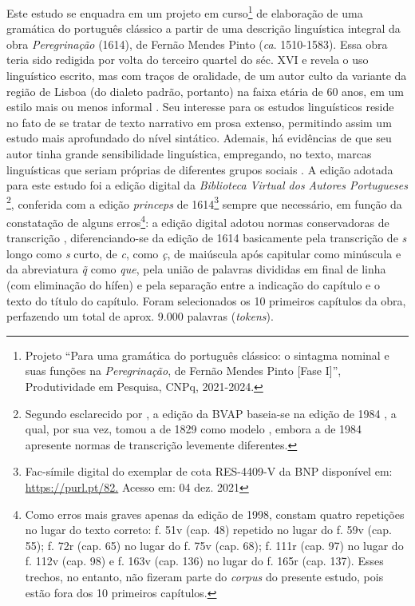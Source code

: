 \documentclass[portuguese]{textolivre}
\begin{document}
Este estudo se enquadra em um projeto em curso\footnote{Projeto “Para uma gramática do português clássico: o sintagma nominal e suas funções na \textit{Peregrinação}, de Fernão Mendes Pinto [Fase I]”, Produtividade em Pesquisa, CNPq, 2021-2024.} de elaboração de uma gramática do português clássico a partir de uma descrição linguística integral da obra \textit{Peregrinação} (1614), de Fernão Mendes Pinto (\textit{ca}. 1510-1583). Essa obra teria sido redigida por volta do terceiro quartel do séc. XVI e revela o uso linguístico escrito, mas com traços de oralidade, de um autor culto da variante da região de Lisboa (do dialeto padrão, portanto) na faixa etária de 60 anos, em um estilo mais ou menos informal \cite{cambraia_contributo_2000}. Seu interesse para os estudos linguísticos reside no fato de se tratar de texto narrativo em prosa extenso, permitindo assim um estudo mais aprofundado do nível sintático. Ademais, há evidências de que seu autor tinha grande sensibilidade linguística, empregando, no texto, marcas linguísticas que seriam próprias de diferentes grupos sociais \cite{cambraia_mudancinterrompida_2003}. A edição adotada para este estudo foi a edição digital da \textit{Biblioteca Virtual dos Autores Portugueses} \cite{biblioteca_coordenacao_1998}\footnote{Segundo esclarecido por \textcite[p.~185]{correia_construcao_1999}, a edição da BVAP baseia-se na edição de 1984 \cite{pinto_peregrinacao_1984}, a qual, por sua vez, tomou a de 1829 \cite{pinto_peregrinacao_1829} como modelo \cite[p.~VI]{pinto_peregrinacao_1984}, embora a de 1984 apresente normas de transcrição levemente diferentes.}, conferida com a edição \textit{princeps} de 1614\footnote{Fac-símile digital do exemplar de cota RES-4409-V da BNP disponível em: \url{https://purl.pt/82.} Acesso em: 04 dez. 2021} sempre que necessário, em função da constatação de alguns erros\footnote{Como erros mais graves apenas da edição de 1998, constam quatro repetições no lugar do texto correto: f. 51v (cap. 48) repetido no lugar do f. 59v (cap. 55); f. 72r (cap. 65) no lugar do f. 75v (cap. 68); f. 111r (cap. 97) no lugar do f. 112v (cap. 98) e  f. 163v (cap. 136) no lugar do f. 165r (cap. 137). Esses trechos, no entanto, não fizeram parte do \textit{corpus} do presente estudo, pois estão fora dos 10 primeiros capítulos.}: a edição digital adotou normas conservadoras de transcrição \cite{cambraia_introducao_2005}, diferenciando-se da edição de 1614 basicamente pela transcrição de \textit{s} longo como \textit{s} curto, de \textit{c}, como \textit{ç}, de maiúscula após capitular como minúscula e da abreviatura \textit{q̃} como \textit{que}, pela união de palavras divididas em final de linha (com eliminação do hífen) e pela separação entre a indicação do capítulo e o texto do título do capítulo. Foram selecionados os 10 primeiros capítulos da obra, perfazendo um total de aprox. 9.000 palavras (\textit{tokens}).
\end{document}
